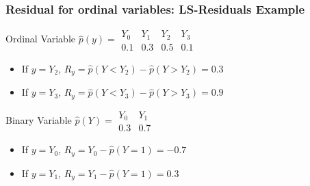 \documentclass{beamer}
\begin{document}
\begin{frame}
	\frametitle{Residual for ordinal variables: LS-Residuals Example}
	\begin{block}{Ordinal Variable}
		\vspace{1em}
			$ \hat{p}(y) = \begin{array}{llll} Y_0 & Y_1 & Y_2 & Y_3 \\ 0.1 & 0.3 & 0.5 & 0.1 \end{array} $
		\begin{itemize}
			\item If $ y = Y_2 $, $ R_{y} = \hat{p}(Y < Y_2) - \hat{p}(Y > Y_2) = 0.3 $
			\item If $ y = Y_3 $, $ R_{y} = \hat{p}(Y < Y_3) - \hat{p}(Y > Y_3) = 0.9 $
		\end{itemize}
	\end{block}
	\begin{block}{Binary Variable}
		$\hat{p}(Y) = \begin{array}{ll} Y_0 & Y_1 \\ 0.3 & 0.7 \end{array} $
		\begin{itemize}	
			\item If $ y = Y_0 $, $ R_{y} = Y_0 - \hat{p}(Y=1) = -0.7 $
			\item If $ y = Y_1 $, $ R_{y} = Y_1 - \hat{p}(Y=1) = 0.3 $
		\end{itemize}
	\end{block}
\end{frame}
\end{document}
